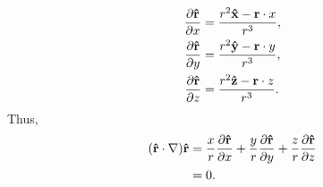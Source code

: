 \begin{sol}[1.22]
                \begin{equation}
                    \begin{aligned}
                        \frac{\partial \mathbf{\hat{r}}}{\partial x} &= \frac{r^2\mathbf{\hat{x}}-\mathbf{r}\cdot x}{r^3}, \\
                        \frac{\partial \mathbf{\hat{r}}}{\partial y} &= \frac{r^2\mathbf{\hat{y}}-\mathbf{r}\cdot y}{r^3}, \\
                        \frac{\partial \mathbf{\hat{r}}}{\partial z} &= \frac{r^2\mathbf{\hat{z}}-\mathbf{r}\cdot z}{r^3}.
                    \end{aligned}
                \end{equation}
                    Thus,
                \begin{equation}
                    \begin{aligned}
                    (\mathbf{\hat{r}} \cdot \nabla)\mathbf{\hat{r}} &= \frac{x}{r} \frac{\partial \mathbf{\hat{r}}}{\partial x} + \frac{y}{r} \frac{\partial \mathbf{\hat{r}}}{\partial y} + \frac{z}{r}\frac{\partial \mathbf{\hat{r}}}{\partial z}\\
                        &=0.
                    \end{aligned}
                \end{equation}
            \end{sol}

